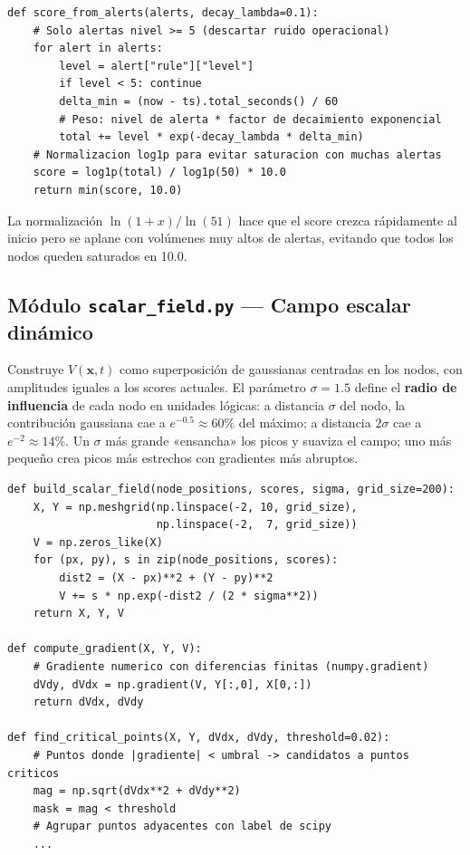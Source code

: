\documentclass[12pt,a4paper]{article}
\begin{document}
\begin{lstlisting}[caption={Cálculo del score con decaimiento temporal y normalización logarítmica.}]
def score_from_alerts(alerts, decay_lambda=0.1):
    # Solo alertas nivel >= 5 (descartar ruido operacional)
    for alert in alerts:
        level = alert["rule"]["level"]
        if level < 5: continue
        delta_min = (now - ts).total_seconds() / 60
        # Peso: nivel de alerta * factor de decaimiento exponencial
        total += level * exp(-decay_lambda * delta_min)
    # Normalizacion log1p para evitar saturacion con muchas alertas
    score = log1p(total) / log1p(50) * 10.0
    return min(score, 10.0)
\end{lstlisting}

La normalización $\ln(1+x)/\ln(51)$ hace que el score crezca
rápidamente al inicio pero se aplane con volúmenes muy altos de
alertas, evitando que todos los nodos queden saturados en 10.0.

\subsection{Módulo \texttt{scalar\_field.py} — Campo escalar dinámico}

Construye $V(\mathbf{x}, t)$ como superposición de gaussianas centradas
en los nodos, con amplitudes iguales a los scores actuales. El parámetro
$\sigma = 1.5$ define el \textbf{radio de influencia} de cada nodo en
unidades lógicas: a distancia $\sigma$ del nodo, la contribución
gaussiana cae a $e^{-0.5} \approx 60\%$ del máximo; a distancia
$2\sigma$ cae a $e^{-2} \approx 14\%$. Un $\sigma$ más grande
«ensancha» los picos y suaviza el campo; uno más pequeño crea picos
más estrechos con gradientes más abruptos.

\begin{lstlisting}[caption={Construcción del campo escalar por superposición gaussiana.}]
def build_scalar_field(node_positions, scores, sigma, grid_size=200):
    X, Y = np.meshgrid(np.linspace(-2, 10, grid_size),
                       np.linspace(-2,  7, grid_size))
    V = np.zeros_like(X)
    for (px, py), s in zip(node_positions, scores):
        dist2 = (X - px)**2 + (Y - py)**2
        V += s * np.exp(-dist2 / (2 * sigma**2))
    return X, Y, V

def compute_gradient(X, Y, V):
    # Gradiente numerico con diferencias finitas (numpy.gradient)
    dVdy, dVdx = np.gradient(V, Y[:,0], X[0,:])
    return dVdx, dVdy

def find_critical_points(X, Y, dVdx, dVdy, threshold=0.02):
    # Puntos donde |gradiente| < umbral -> candidatos a puntos criticos
    mag = np.sqrt(dVdx**2 + dVdy**2)
    mask = mag < threshold
    # Agrupar puntos adyacentes con label de scipy
    ...
\end{lstlisting}
\end{document}
